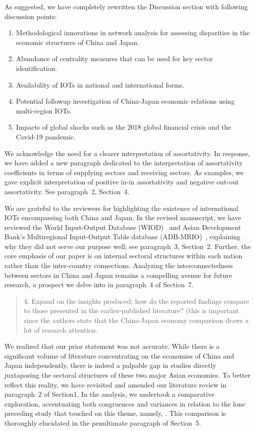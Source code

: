 \documentclass[12pt]{article}
\newenvironment{comment}%
{\begin{quotation}\noindent\small\it\color{darkblue}\ignorespaces%
}{\end{quotation}}
\begin{document}
As suggested, we have completely rewritten the Discussion section with following
discussion points:
\begin{enumerate}
\item
  Methodological innovations in network analysis for assessing 
  disparities in the economic structures of China and Japan.
\item
  Abundance of centrality measures that can be used for key sector
  identification.
\item
  Availability of IOTs in national and international forms.
\item
  Potential followup investigation of China-Japan economic relations using
  multi-region IOTs.
\item
  Impacts of global shocks such as the 2018 global financial crisis and the
  Covid-19 pandemic.
\end{enumerate}

We acknowledge the need for a clearer interpretation of assortativity. In
response, we have added a new paragraph dedicated to the interpretation of
assortativity coefficients in terms of supplying sectors and receiving sectors.
As examples, we gave explicit interpretation of positive in-in assortativity and
negative out-out assortativity. See paragraph~2, Section~4.


We are grateful to the reviewers for highlighting the existence of international
IOTs encompassing both China and Japan. In the revised manuscript, we have
reviewed the World Input-Output Database (WIOD)~\citep{timmer2015illustrated}
and Asian Development Bank's Multiregional Input-Output Table database
(ADB-MRIO)~\citep{ADB2023iot}, explaining why they did not serve our purpose
well; see paragraph~3, Section~2. Further, the core emphasis of our paper is on
internal sectoral structures within each nation rather than the inter-country
connections. Analyzing the interconnectedness between sectors in China and Japan
remains a compelling avenue for future research, a prospect we delve into in
paragraph~4 of Section~7.


\begin{comment}
4. Expand on the insights produced; how do the reported findings compare to
those presented in the earlier-published literature? (this is important
since the authors state that the China-Japan economy comparison draws 
a lot of research attention. 
\end{comment}
  
We realized that our prior statement was not accurate.
While there is a significant volume of literature concentrating on the economies
of China and Japan independently, there is indeed a palpable gap in studies
directly juxtaposing the sectoral structures of these two major Asian
economies. To better reflect this reality, we have revisited and amended our
literature review in paragraph~2 of Section1. In the analysis, we undertook a
comparative exploration, accentuating both congruences and variances in relation
to the lone preceding study that touched on this theme, namely,
\citet{li2017examining}. This comparison is thoroughly elucidated in the
penultimate paragraph of Section~5.
\end{document}

